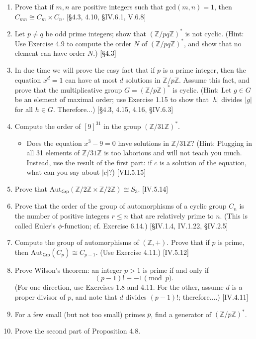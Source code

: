 \begin{enumerate}
    \item Prove that if $m, n$ are positive integers such that $\text{gcd}(m, n)=1$, then $C_{mn} \cong C_m \times C_n$. [\S4.3, 4.10, \S IV.6.1, V.6.8]

    \item Let $p \ne q$ be odd prime integers; show that $(\mathbb{Z}/pq\mathbb{Z})^*$ is not cyclic. (Hint: Use Exercise 4.9 to compute the order $N$ of $(\mathbb{Z}/pq\mathbb{Z})^*$, and show that no element can have order $N$.) [\S4.3]

    \item In due time we will prove the easy fact that if $p$ is a prime integer, then the equation $x^d = 1$ can have at most $d$ solutions in $\mathbb{Z}/p\mathbb{Z}$. Assume this fact, and prove that the multiplicative group $G = (\mathbb{Z}/p\mathbb{Z})^*$ is cyclic. (Hint: Let $g \in G$ be an element of maximal order; use Exercise 1.15 to show that $|h|$ divides $|g|$ for all $h \in G$. Therefore...) [\S4.3, 4.15, 4.16, \S IV.6.3]

    \item Compute the order of $[9]^{31}$ in the group $(\mathbb{Z}/31\mathbb{Z})^*$.
          \begin{itemize}
              \item Does the equation $x^3 - 9 = 0$ have solutions in $\mathbb{Z}/31\mathbb{Z}$? (Hint: Plugging in all 31 elements of $\mathbb{Z}/31\mathbb{Z}$ is too laborious and will not teach you much. Instead, use the result of the first part: if $c$ is a solution of the equation, what can you say about $|c|$?) [VII.5.15]
          \end{itemize}

    \item Prove that $\text{Aut}_{\mathsf{Grp}}(\mathbb{Z}/2\mathbb{Z} \times \mathbb{Z}/2\mathbb{Z}) \cong S_3$. [IV.5.14]

    \item Prove that the order of the group of automorphisms of a cyclic group $C_n$ is the number of positive integers $r \le n$ that are relatively prime to $n$. (This is called Euler's $\phi$-function; cf. Exercise 6.14.) [\S IV.1.4, IV.1.22, \S IV.2.5]

    \item Compute the group of automorphisms of $(\mathbb{Z}, +)$. Prove that if $p$ is prime, then $\text{Aut}_{\mathsf{Grp}}(C_p) \cong C_{p-1}$. (Use Exercise 4.11.) [IV.5.12]

    \item Prove Wilson's theorem: an integer $p > 1$ is prime if and only if
          \[ (p-1)! \equiv -1 \pmod p. \]
          (For one direction, use Exercises 1.8 and 4.11. For the other, assume $d$ is a proper divisor of $p$, and note that $d$ divides $(p-1)!$; therefore....) [IV.4.11]

    \item For a few small (but not too small) primes $p$, find a generator of $(\mathbb{Z}/p\mathbb{Z})^*$.

    \item Prove the second part of Proposition 4.8.
\end{enumerate}